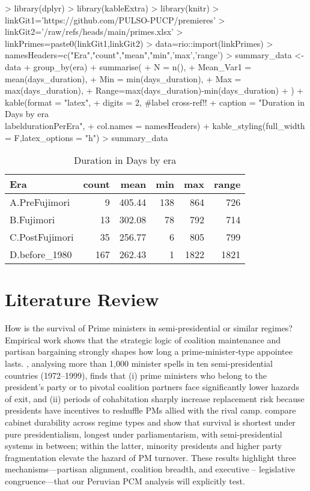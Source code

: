 \documentclass[a4paper, 12pt]{article}
\begin{document}
\begin{Schunk}
\begin{Sinput}
> library(dplyr)
> library(kableExtra)
> library(knitr)
> linkGit1='https://github.com/PULSO-PUCP/premieres'
> linkGit2='/raw/refs/heads/main/primes.xlsx'
> linkPrimes=paste0(linkGit1,linkGit2)
> data=rio::import(linkPrimes)
> namesHeaders=c("Era","count","mean","min",'max','range')
> summary_data <- data %>%
+   group_by(era) %>%
+   summarise(
+     N = n(),
+     Mean_Var1 = mean(days_duration),
+     Min = min(days_duration),
+     Max = max(days_duration),
+     Range=max(days_duration)-min(days_duration)
+   ) %>%
+      kable(format = "latex", 
+            digits = 2,                #label cross-ref!!
+            caption = "Duration in Days by era\\label{durationPerEra}",
+            col.names = namesHeaders)%>%
+     kable_styling(full_width = F,latex_options = "h")
> summary_data
\end{Sinput}
\begin{table}[!h]
\centering
\caption{Duration in Days by era\label{durationPerEra}}
\centering
\begin{tabular}[t]{l|r|r|r|r|r}
\hline
Era & count & mean & min & max & range\\
\hline
A.PreFujimori & 9 & 405.44 & 138 & 864 & 726\\
\hline
B.Fujimori & 13 & 302.08 & 78 & 792 & 714\\
\hline
C.PostFujimori & 35 & 256.77 & 6 & 805 & 799\\
\hline
D.before\_1980 & 167 & 262.43 & 1 & 1822 & 1821\\
\hline
\end{tabular}
\end{table}\end{Schunk}


\section{Literature Review}\label{letrev}

How is the  survival of Prime ministers in semi-presidential or similar regimes? Empirical work shows that the strategic logic of coalition maintenance and partisan bargaining strongly shapes how long a prime‑minister‑type appointee lasts. \citet{amorim_neto_presidential_2006}, analysing more than 1,000 minister spells in ten semi‑presidential countries (1972–1999), finds that (i) prime ministers who belong to the president’s party or to pivotal coalition partners face significantly lower hazards of exit, and (ii) periods of cohabitation sharply increase replacement risk because presidents have incentives to reshuffle PMs allied with the rival camp. \citet{cheibub_government_2004} compare cabinet durability across regime types and show that survival is shortest under pure presidentialism, longest under parliamentarism, with semi‑presidential systems in between; within the latter, minority presidents and higher party fragmentation elevate the hazard of PM turnover. These results highlight three mechanisms—partisan alignment, coalition breadth, and executive – legislative congruence—that our Peruvian PCM analysis will explicitly test.
\end{document}
